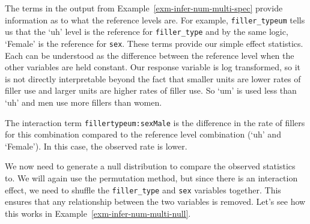 \documentclass[
  letterpaper,
  krantz1]{latex/krantz-mod}
\theoremstyle{definition}
\theoremstyle{definition}
\theoremstyle{remark}
\begin{document}
The terms in the output from Example~\ref{exm-infer-num-multi-spec}
provide information as to what the reference levels are. For example,
\texttt{filler\_typeum} tells us that the `uh' level is the reference
for \texttt{filler\_type} and by the same logic, `Female' is the
reference for \texttt{sex}. These terms provide
our simple effect statistics. Each can be understood as the difference
between the reference level when the other variables are held constant.
Our response variable is log transformed, so
it is not directly interpretable beyond the fact that smaller units are
lower rates of filler use and larger units are higher rates of filler
use. So `um' is used less than `uh' and men use more fillers than women.

The interaction term
\texttt{fillertypeum:sexMale} is the difference in the rate of fillers
for this combination compared to the reference level combination (`uh'
and `Female'). In this case, the observed rate is lower.

We now need to generate a null
distribution to compare the observed
statistics to. We will again use the permutation method, but since there
is an interaction effect, we need to shuffle the \texttt{filler\_type}
and \texttt{sex} variables together. This ensures that any relationship
between the two variables is removed. Let's see how this works in
Example~\ref{exm-infer-num-multi-null}.
\end{document}
